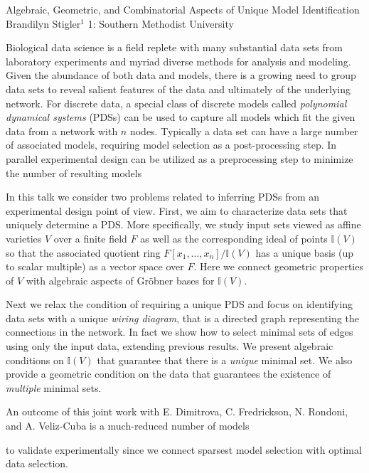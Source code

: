 \vspace{1.5ex}
\abs
{Algebraic, Geometric, and Combinatorial Aspects of Unique Model Identification}
{Brandilyn Stigler$^{1}$}
{1: Southern Methodist University}
{Biological data science is a field replete with many substantial data sets from laboratory experiments and myriad diverse methods for analysis and modeling.  Given the abundance of both data and models, there is a growing need to group data sets to reveal salient features of the data and ultimately of the underlying network.   For discrete data, a special class of discrete models called \emph{polynomial dynamical systems} (PDSs) can be used to capture all models which fit the given data from a network with $n$ nodes.  Typically a data set can have a large number of associated models, requiring model selection as a post-processing step.  In parallel experimental design can be utilized as a preprocessing step to minimize the number of resulting models

In this talk we consider two problems related to inferring PDSs from an experimental design point of view.  First, we aim to characterize data sets that uniquely determine a PDS.  More specifically, we study input sets viewed as affine varieties $V$ over a finite field $F$ as well as the corresponding ideal of points $\mathbb I(V)$ so that the associated quotient ring $F[x_1,\ldots,x_n]/\mathbb I(V)$ has a unique basis (up to scalar multiple) as a vector space over $F$.  Here we connect geometric properties of $V$ with algebraic aspects of Gr\"obner bases for $\mathbb I(V)$.

Next we relax the condition of requiring a unique PDS and focus on identifying data sets with a unique \emph{wiring diagram}, that is a directed graph representing the connections in the network.  In fact we show how to select minimal sets of edges using only the input data, extending previous results. We present algebraic conditions on $\mathbb I(V)$ that guarantee that there is a \emph{unique} minimal set.  We also provide a geometric condition on the data that guarantees the existence of \emph{multiple} minimal sets. 

An outcome of this joint work with E. Dimitrova, C. Fredrickson, N. Rondoni, and A. Veliz-Cuba is a much-reduced number of models

to validate experimentally since we connect sparsest model selection with optimal data selection.}


